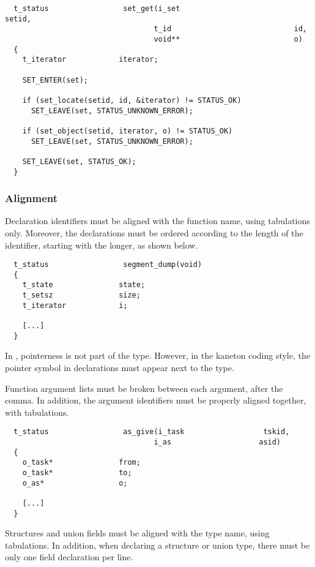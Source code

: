 \begin{verbatim}
  t_status                 set_get(i_set                           setid,
                                  t_id                            id,
                                  void**                          o)
  {
    t_iterator            iterator;

    SET_ENTER(set);

    if (set_locate(setid, id, &iterator) != STATUS_OK)
      SET_LEAVE(set, STATUS_UNKNOWN_ERROR);

    if (set_object(setid, iterator, o) != STATUS_OK)
      SET_LEAVE(set, STATUS_UNKNOWN_ERROR);

    SET_LEAVE(set, STATUS_OK);
  }
\end{verbatim}


\subsubsection{Alignment}

Declaration identifiers must be aligned with the function name, using
tabulations only. Moreover, the declarations must be ordered according
to the length of the identifier, starting with the longer, as shown below.

\begin{verbatim}
  t_status                 segment_dump(void)
  {
    t_state               state;
    t_setsz               size;
    t_iterator            i;

    [...]
  }
\end{verbatim}

In , pointerness is not part of the type. However, in the kaneton
coding style, the \code{*} pointer symbol in declarations must appear next
to the type.

Function argument lists must be broken between each argument, after the
comma. In addition, the argument identifiers must be properly aligned
together, with tabulations.

\begin{verbatim}
  t_status                 as_give(i_task                  tskid,
                                  i_as                    asid)
  {
    o_task*               from;
    o_task*               to;
    o_as*                 o;

    [...]
  }
\end{verbatim}

Structures and union fields must be aligned with the type name, using
tabulations. In addition, when declaring a structure or union type, there
must be only one field declaration per line.

